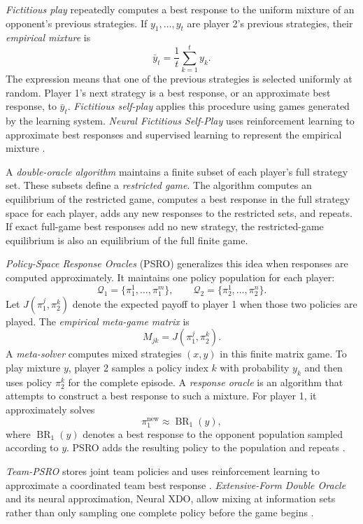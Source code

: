 \emph{Fictitious play} repeatedly computes a best response to the uniform mixture of an opponent's previous strategies. If $y_1,\ldots,y_t$ are player 2's previous strategies, their \emph{empirical mixture} is
\[
    \bar y_t=\frac{1}{t}\sum_{k=1}^t y_k.
\]
The expression means that one of the previous strategies is selected uniformly at random. Player 1's next strategy is a best response, or an approximate best response, to $\bar y_t$. \emph{Fictitious self-play} applies this procedure using games generated by the learning system. \emph{Neural Fictitious Self-Play} uses reinforcement learning to approximate best responses and supervised learning to represent the empirical mixture \cite{heinrich2015fictitious,heinrich2016nfsp}.

A \emph{double-oracle algorithm} maintains a finite subset of each player's full strategy set. These subsets define a \emph{restricted game}. The algorithm computes an equilibrium of the restricted game, computes a best response in the full strategy space for each player, adds any new responses to the restricted sets, and repeats. If exact full-game best responses add no new strategy, the restricted-game equilibrium is also an equilibrium of the full finite game.

\emph{Policy-Space Response Oracles} (PSRO) generalizes this idea when responses are computed approximately. It maintains one policy population for each player:
\[
    \mathcal{Q}_1=\{\pi_1^1,\ldots,\pi_1^m\},
    \qquad
    \mathcal{Q}_2=\{\pi_2^1,\ldots,\pi_2^n\}.
\]
Let $J(\pi_1^j,\pi_2^k)$ denote the expected payoff to player 1 when those two policies are played. The \emph{empirical meta-game matrix} is
\[
    M_{jk}=J(\pi_1^j,\pi_2^k).
\]
A \emph{meta-solver} computes mixed strategies $(x,y)$ in this finite matrix game. To play mixture $y$, player 2 samples a policy index $k$ with probability $y_k$ and then uses policy $\pi_2^k$ for the complete episode. A \emph{response oracle} is an algorithm that attempts to construct a best response to such a mixture. For player 1, it approximately solves
\[
    \pi_1^{\mathrm{new}}
    \approx
    \operatorname{BR}_1
    (y),
\]
where $\operatorname{BR}_1(y)$ denotes a best response to the opponent population sampled according to $y$. PSRO adds the resulting policy to the population and repeats \cite{lanctot2017psro}.

\emph{Team-PSRO} stores joint team policies and uses reinforcement learning to approximate a coordinated team best response \cite{mcaleer2023teampsro}. \emph{Extensive-Form Double Oracle} and its neural approximation, Neural XDO, allow mixing at information sets rather than only sampling one complete policy before the game begins \cite{mcaleer2021xdo}.


